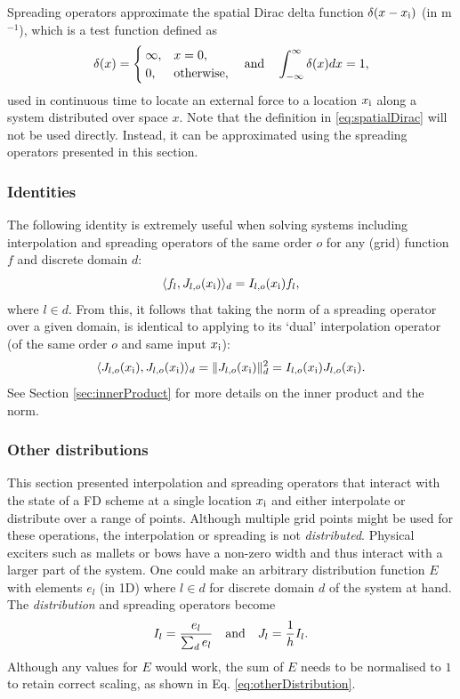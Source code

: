 Spreading operators approximate the spatial Dirac delta function $\delta(x-x_{\text{i}})$ (in m$^{-1}$), which is a test function defined as
\begin{equation}\label{eq:spatialDirac}
    \delta(x)= \begin{cases}
        \infty, & x = 0,\\
        0, & \text{otherwise},
    \end{cases} \quad \text{and} \quad \int_{-\infty}^{\infty} \delta(x)dx = 1,
\end{equation}
used in continuous time to locate an external force to a location $x_{\text{i}}$ along a system distributed over space $x$. Note that the definition in \eqref{eq:spatialDirac} will not be used directly. Instead, it can be approximated using the spreading operators presented in this section.

\subsubsection{Identities}
The following identity is extremely useful when solving systems including interpolation and spreading operators of the same order $o$ for any (grid) function $f$ and discrete domain $d$:
\begin{equation}\label{eq:identityIJ}
    \langle f_l, J_{l,o}(x_{\text{i}}) \rangle_d = I_{l,o}(x_{\text{i}}) f_l,
\end{equation}
where $l\in d$. From this, it follows that taking the norm of a spreading operator over a given domain, is identical to applying to its `dual' interpolation operator (of the same order $o$ and same input $x_{\text{i}}$):
\begin{equation}\label{eq:JnormIJ}
    \langle  J_{l,o}(x_{\text{i}}), J_{l,o}(x_{\text{i}})\rangle_d = \lVert J_{l,o}(x_{\text{i}})\rVert^2_d = I_{l,o}(x_{\text{i}})J_{l,o}(x_{\text{i}}).
\end{equation}
See Section \ref{sec:innerProduct} for more details on the inner product and the norm.

\subsubsection{Other distributions}
This section presented interpolation and spreading operators that interact with the state of a FD scheme at a single location $x_{\text{i}}$ and either interpolate or distribute over a range of points. Although multiple grid points might be used for these operations, the interpolation or spreading is not \textit{distributed}. Physical exciters such as mallets or bows have a non-zero width and thus interact with a larger part of the system. One could make an arbitrary distribution function $E$ with elements $e_l$ (in 1D) where $l\in d$ for discrete domain $d$ of the system at hand. The \textit{distribution} and spreading operators become
\begin{equation}\label{eq:otherDistribution}
    I_l = \frac{e_l}{\sum_d e_l} \quad \text{and} \quad J_l = \frac{1}{h}I_l.
\end{equation}
Although any values for $E$ would work, the sum of $E$ needs to be normalised to $1$ to retain correct scaling, as shown in Eq. \eqref{eq:otherDistribution}.

